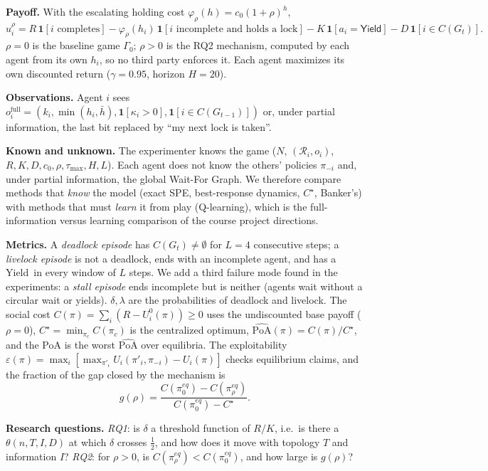 \documentclass[10pt]{article}
\newcommand{\PoAhat}{\widehat{\mathrm{PoA}}}
\newcommand{\Yield}{\textsf{Yield}}
\begin{document}
\textbf{Payoff.} With the escalating holding cost $\varphi_\rho(h)=c_0(1+\rho)^h$,
\begin{equation}\label{eq:payoff}
u^\rho_i = R\,\mathbf 1[\text{$i$ completes}] - \varphi_\rho(h_i)\,\mathbf 1[\text{$i$ incomplete and holds a lock}]
 - K\,\mathbf 1[a_i=\Yield] - D\,\mathbf 1[i\in C(G_t)] .
\end{equation}
$\rho=0$ is the baseline game $\Gamma_0$; $\rho>0$ is the RQ2 mechanism, computed by each agent from its own $h_i$, so
no third party enforces it. Each agent maximizes its own discounted return ($\gamma=0.95$, horizon $H=20$).

\textbf{Observations.} Agent $i$ sees $o^{\text{full}}_i=(k_i,\min(h_i,\bar h),\mathbf 1[\kappa_i>0],\mathbf 1[i\in
C(G_{t-1})])$ or, under partial information, the last bit replaced by ``my next lock is taken''.

\textbf{Known and unknown.} The experimenter knows the game ($N$, $(\mathcal R_i,o_i)$, $R,K,D,c_0,\rho,\tau_{\max},H,L$).
Each agent does not know the others' policies $\pi_{-i}$ and, under partial information, the global Wait-For Graph. We
therefore compare methods that \emph{know} the model (exact SPE, best-response dynamics, $C^\star$, Banker's) with methods
that must \emph{learn} it from play (Q-learning), which is the full-information versus learning comparison of the
course project directions.

\textbf{Metrics.} A \emph{deadlock episode} has $C(G_t)\neq\emptyset$ for $L=4$ consecutive steps; a \emph{livelock
episode} is not a deadlock, ends with an incomplete agent, and has a \Yield\ in every window of $L$ steps. We add a third
failure mode found in the experiments: a \emph{stall episode} ends incomplete but is neither (agents wait without a circular
wait or yields). $\delta,\lambda$ are the probabilities of deadlock and livelock. The social cost
$C(\pi)=\sum_i(R-U^0_i(\pi))\ge0$ uses the undiscounted base payoff ($\rho=0$), $C^\star=\min_{\pi_c}C(\pi_c)$ is the
centralized optimum, $\PoAhat(\pi)=C(\pi)/C^\star$, and the PoA is the worst $\PoAhat$ over equilibria. The exploitability
$\varepsilon(\pi)=\max_i[\max_{\pi'_i}U_i(\pi'_i,\pi_{-i})-U_i(\pi)]$ checks equilibrium claims, and the fraction of the
gap closed by the mechanism is
\begin{equation}\label{eq:g}
g(\rho)=\frac{C(\pi^{eq}_0)-C(\pi^{eq}_\rho)}{C(\pi^{eq}_0)-C^\star}.
\end{equation}

\textbf{Research questions.} \emph{RQ1}: is $\delta$ a threshold function of $R/K$, i.e.\ is there a $\theta(n,T,I,D)$ at
which $\delta$ crosses $\tfrac12$, and how does it move with topology $T$ and information $I$? \emph{RQ2}: for $\rho>0$,
is $C(\pi^{eq}_\rho)<C(\pi^{eq}_0)$, and how large is $g(\rho)$?
\end{document}
